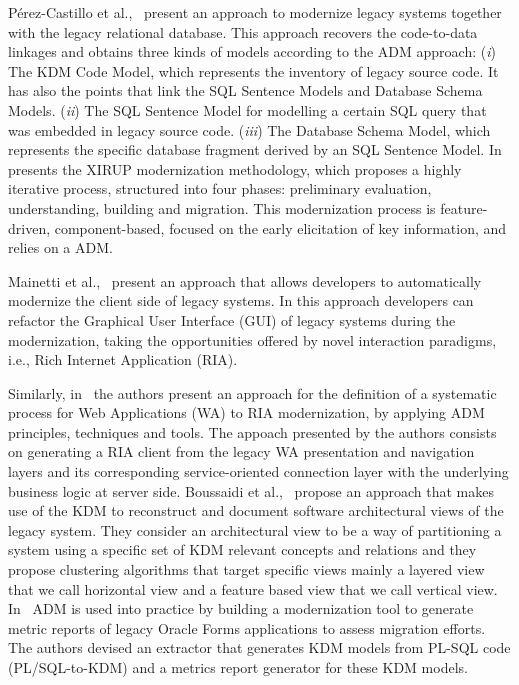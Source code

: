  P\'{e}rez-Castillo et al.,~\cite{5328801, delCastillo:2009:PRP:1529282.1529753, ICEISPerez:CastilloGCP12} present an approach to modernize legacy systems together with the legacy relational database. This approach recovers the code-to-data linkages and obtains three kinds of models according to the ADM approach: (\textit{i}) The KDM Code Model, which represents the inventory of legacy source code. It has also the points that link the SQL Sentence Models and Database Schema Models. (\textit{ii}) The SQL Sentence Model for modelling a certain SQL query that was embedded in legacy source code. (\textit{iii}) The Database Schema Model, which represents the specific database fragment derived by an SQL Sentence Model. In~\cite{FuentesFernandez2012247} presents the XIRUP modernization methodology, which proposes a highly iterative process, structured into four phases: preliminary evaluation, understanding, building and migration. This modernization process is feature-driven, component-based, focused on the early elicitation of key information, and relies on a ADM.

Mainetti et al.,~\cite{Mainetti:2012:MMT:2364120.2364182} present an approach that allows developers to automatically modernize the client side of legacy systems. In this approach developers can refactor the Graphical User Interface (GUI) of legacy systems during the modernization, taking the opportunities offered by novel interaction paradigms, i.e., Rich Internet Application (RIA). 

Similarly, in~\cite{Rodriguez-Echeverria:2011:MLW:2186508.2186536} the authors present an approach for the definition of a systematic process for Web Applications (WA) to RIA modernization, by applying ADM principles, techniques and tools. The appoach presented by the authors consists on generating a RIA client from the legacy WA presentation and navigation layers and its corresponding service-oriented connection layer with the underlying business logic at server side. Boussaidi et al.,~\cite{6385130} propose an approach that makes use of the KDM to reconstruct and document software architectural views of the legacy system. They consider an architectural view to be a way of partitioning a system using a specific set of KDM relevant concepts and relations and they propose clustering algorithms that target specific views mainly a layered view that we call horizontal view and a feature based view that we call vertical view. In~\cite{5440163} ADM is used into practice by building a modernization tool to generate metric reports of legacy Oracle Forms applications to assess migration efforts. The authors devised an extractor that generates KDM models from PL-SQL code (PL/SQL-to-KDM) and a metrics report generator for these KDM models. 

